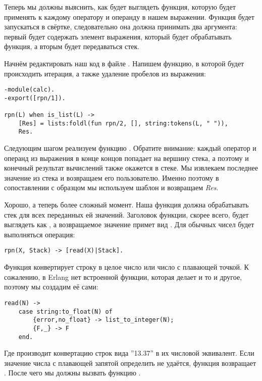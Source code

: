 Теперь мы должны выяснить, как будет выглядеть функция, которую  будет применять к каждому оператору и операнду в нашем выражении.
Функция будет запускаться в свёртке, следовательно она должна принимать два аргумента: первый будет содержать элемент выражения, который будет обрабатывать функция, а вторым будет передаваться стек.

Начнём редактировать наш код в файле .
Напишем функцию, в которой будет происходить итерация, а также удаление пробелов из выражения:
\begin{lstlisting}[style=erlang]
-module(calc).
-export([rpn/1]).
 
rpn(L) when is_list(L) ->
    [Res] = lists:foldl(fun rpn/2, [], string:tokens(L, " ")),
    Res.
\end{lstlisting}

Следующим шагом реализуем функцию .
Обратите внимание: каждый оператор и операнд из выражения в конце концов попадает на вершину стека, а поэтому и конечный результат вычислений также окажется в стеке.
Мы извлекаем последнее значение из стека и возвращаем его пользователю.
Именно поэтому в сопоставлении с образцом мы используем шаблон \ops{[Res]} и возвращаем \emph{Res}.

Хорошо, а теперь более сложный момент.
Наша функция  должна обрабатывать стек для всех переданных ей значений.
Заголовок функции, скорее всего, будет выглядеть как , а возвращаемое значение примет вид .
Для обычных чисел будет выполняться операция:
\begin{lstlisting}[style=erlang]
rpn(X, Stack) -> [read(X)|Stack].
\end{lstlisting}

Функция  конвертирует строку в целое число или число с плавающей точкой.
К сожалению, в Erlang нет встроенной функции, которая делает и то и другое, поэтому мы создадим её сами:
\begin{lstlisting}[style=erlang]
read(N) ->
    case string:to_float(N) of
        {error,no_float} -> list_to_integer(N);
        {F,_} -> F
    end.
\end{lstlisting}

Где  производит конвертацию строк вида ''13.37'' в их числовой эквивалент.
Если значение числа с плавающей запятой определить не удаётся, функция возвращает .
После чего мы должны вызвать функцию .


